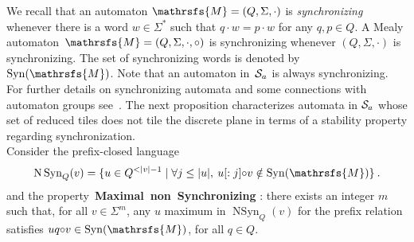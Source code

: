 \documentclass{amsart}
\begin{document}
{We recall that an automaton ${{{\mathrsfs{{M}}}}}=({{{Q}}},{{{\Sigma}}},{{{\cdot}}})$ is \emph{synchronizing} whenever there is a word $w\in {{{\Sigma}}}^{*}$ such that $q{{{\cdot}}} w=p{{{\cdot}}} w$ for any $q,p\in {{{Q}}}$.
A Mealy automaton~${{{\mathrsfs{{M}}}}} = ({{{Q}}},{{{\Sigma}}},{{{\cdot}}},{{{\circ}}})$ is synchronizing whenever $({{{Q}}},{{{\Sigma}}},{{{\cdot}}})$ is synchronizing. The set of synchronizing words is denoted by~$\operatorname{Syn}({{{\mathrsfs{{M}}}}})$.
Note that an automaton in~${\hbox{${\mathcal S}_{a}$}}$ is always synchronizing. For further details on synchronizing automata and some connections with automaton groups see~\cite{DaRo13}. The next proposition characterizes automata in ${\hbox{${\mathcal S}_{a}$}}$ whose set of reduced tiles does not tile the discrete plane in terms of a stability property regarding synchronization. \\
Consider the prefix-closed  language \[\operatorname{N\operatorname{Syn}}_{{{Q}}}(v)=\{u\in {{{Q}}}^{<{|v|-1}} \mid \forall j \le |u|, \: u[:j] {{{\circ}}} v\notin\operatorname{Syn}({{{\mathrsfs{{M}}}}})\}\:.\] and the property~{\small\textbf{{Maximal~non~Synchronizing }}}: there exists an integer $m$ such that, for all $v \in {{{\Sigma}}}^{m}$, any  $u$  maximum in $\operatorname{N\operatorname{Syn}}_{{{Q}}}(v)$ for the prefix relation satisfies $uq {{{\circ}}} v\in \operatorname{Syn}({{{\mathrsfs{{M}}}}})$, for all $q\in {{{Q}}}$.

}
\end{document}
